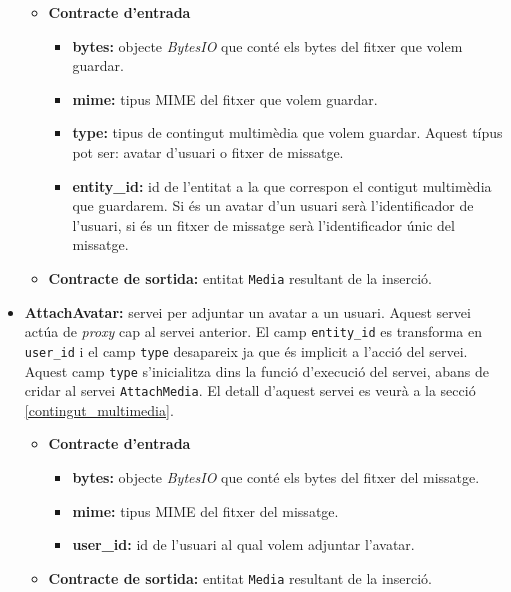 \begin{itemize}
				\begin{itemize}
					\item \textbf{Contracte d'entrada}
						\begin{itemize}
							\item \textbf{bytes:} objecte \emph{BytesIO} que conté els bytes del fitxer que volem guardar.
							\item \textbf{mime:} tipus \ac{MIME} del fitxer que volem guardar.
							\item \textbf{type:} tipus de contingut multimèdia que volem guardar. Aquest típus pot ser: avatar d'usuari o fitxer de missatge.
							\item \textbf{entity\_id:} id de l'entitat a la que correspon el contigut multimèdia que guardarem. Si és un avatar d'un usuari serà l'identificador de l'usuari, si és un fitxer de missatge serà l'identificador únic del missatge.
						\end{itemize}
					\item \textbf{Contracte de sortida:} entitat \texttt{Media} resultant de la inserció.
				\end{itemize}
				
			\item \textbf{AttachAvatar:} servei per adjuntar un avatar a un usuari. Aquest servei actúa de \emph{proxy} cap al servei anterior. El camp \texttt{entity\_id} es transforma en \texttt{user\_id} i el camp \texttt{type} desapareix ja que és implicit a l'acció del servei. Aquest camp \texttt{type} s'inicialitza dins la funció d'execució del servei, abans de cridar al servei \texttt{AttachMedia}.  El detall d'aquest servei es veurà a la secció \ref{contingut_multimedia}.
			
			\begin{itemize}
					\item \textbf{Contracte d'entrada}
						\begin{itemize}
							\item \textbf{bytes:} objecte \emph{BytesIO} que conté els bytes del fitxer del missatge.
							\item \textbf{mime:} tipus \ac{MIME} del fitxer del missatge.
							\item \textbf{user\_id:} id de l'usuari al qual volem adjuntar l'avatar.
						\end{itemize}
					\item \textbf{Contracte de sortida:} entitat \texttt{Media} resultant de la inserció.
				\end{itemize}
				

\end{itemize}

